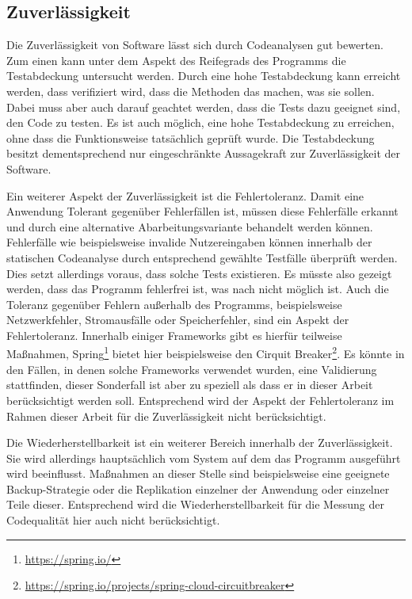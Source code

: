 \documentclass[
	oneside,  %
	ngerman, 
	final, 
	11pt, 
	a4paper, 
	1.1headlines, 
	headinclude=false, 
	footinclude=false, 
	mpinclude=false, 
	pagesize, 
	onecolumn, 
	titlepage, 
	parskip=half, 
	headsepline, 
	chapterprefix=false, 
	version=first, 
	listof=totoc, 
	bibliography=totoc, 
	toc=graduated, 
	fleqn
]{scrbook}
\begin{document}
\subsection{Zuverlässigkeit}
Die Zuverlässigkeit von Software lässt sich durch Codeanalysen gut bewerten.
Zum einen kann unter dem Aspekt des Reifegrads des Programms die Testabdeckung untersucht werden.
Durch eine hohe Testabdeckung kann erreicht werden, dass verifiziert wird, dass die Methoden das machen, was sie sollen.
Dabei muss aber auch darauf geachtet werden, dass die Tests dazu geeignet sind, den Code zu testen.
Es ist auch möglich, eine hohe Testabdeckung zu erreichen, ohne dass die Funktionsweise tatsächlich geprüft wurde.
Die Testabdeckung besitzt dementsprechend nur eingeschränkte Aussagekraft zur Zuverlässigkeit der Software.

Ein weiterer Aspekt der Zuverlässigkeit ist die Fehlertoleranz.
Damit eine Anwendung Tolerant gegenüber Fehlerfällen ist, müssen diese Fehlerfälle erkannt und durch eine alternative Abarbeitungsvariante behandelt werden können.
Fehlerfälle wie beispielsweise invalide Nutzereingaben können innerhalb der statischen Codeanalyse durch entsprechend gewählte Testfälle überprüft werden.
Dies setzt allerdings voraus, dass solche Tests existieren.
Es müsste also gezeigt werden, dass das Programm fehlerfrei ist, was nach \cite{Di1972} nicht möglich ist.
Auch die Toleranz gegenüber Fehlern außerhalb des Programms, beispielsweise Netzwerkfehler, Stromausfälle oder Speicherfehler, sind ein Aspekt der Fehlertoleranz.
Innerhalb einiger Frameworks gibt es hierfür teilweise Maßnahmen, Spring\footnote{\url{https://spring.io/}} bietet hier beispielsweise den Cirquit Breaker\footnote{\url{https://spring.io/projects/spring-cloud-circuitbreaker}}.
Es könnte in den Fällen, in denen solche Frameworks verwendet wurden, eine Validierung stattfinden, dieser Sonderfall ist aber zu speziell als dass er in dieser Arbeit berücksichtigt werden soll.
Entsprechend wird der Aspekt der Fehlertoleranz im Rahmen dieser Arbeit für die Zuverlässigkeit nicht berücksichtigt.

Die Wiederherstellbarkeit ist ein weiterer Bereich innerhalb der Zuverlässigkeit.
Sie wird allerdings hauptsächlich vom System auf dem das Programm ausgeführt wird beeinflusst.
Maßnahmen an dieser Stelle sind beispielsweise eine geeignete Backup-Strategie oder die Replikation einzelner der Anwendung oder einzelner Teile dieser.
Entsprechend wird die Wiederherstellbarkeit für die Messung der Codequalität hier auch nicht berücksichtigt.
\end{document}
